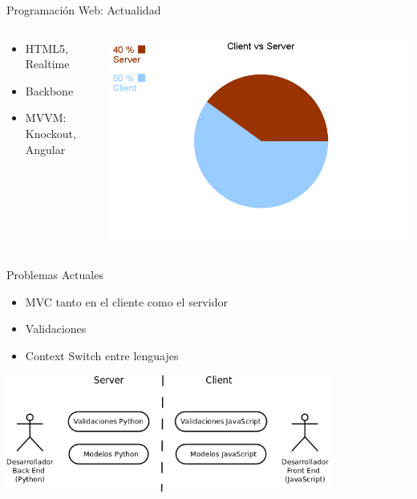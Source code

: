 \documentclass[xcolor=dvipsnames, 14pt]{beamer}
\begin{document}
\begin{frame}{Programación Web: Actualidad}

\begin{columns}
    \begin{column}{0.4\textwidth}
        \begin{itemize}
            \item HTML5, Realtime
            \item Backbone
            \item MVVM: Knockout, Angular
        \end{itemize}
    \end{column}
    \begin{column}{0.6\textwidth}
        \begin{center}
            \includegraphics[width=\textwidth]{img/actualidad.png}
        \end{center}
    \end{column}
\end{columns}

\end{frame}

\begin{frame}{Problemas Actuales}
    \begin{itemize}
        \item MVC tanto en el cliente como el servidor
        \item Validaciones
        \item Context Switch entre lenguajes
    \end{itemize}
    \begin{center}
        \includegraphics[width=0.8\textwidth]{img/problemas.png}
    \end{center}
\end{frame}
\end{document}
